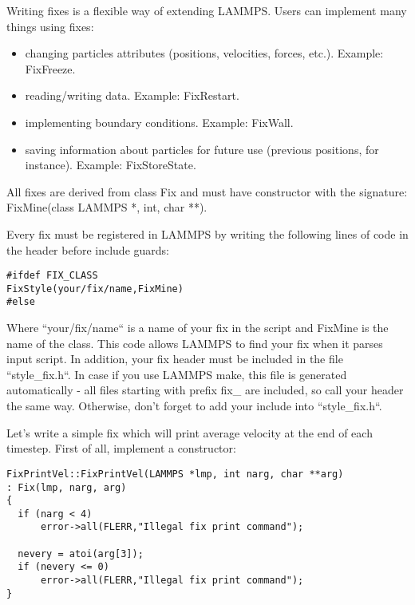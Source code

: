 \documentclass{article}
\begin{document}
Writing fixes is a flexible way of extending LAMMPS.  Users can
implement many things using fixes:

\begin{itemize}
\item changing particles attributes (positions, velocities, forces, etc.).
Example: FixFreeze.
\item reading/writing data. Example: FixRestart.
\item implementing boundary conditions. Example: FixWall.
\item saving information about particles for future use (previous positions,
for instance). Example: FixStoreState.
\end{itemize}

All fixes are derived from class Fix and must have constructor with the
signature: FixMine(class LAMMPS *, int, char **).

Every fix must be registered in LAMMPS by writing the following lines
of code in the header before include guards:

 \begin{center}
 \begin{verbatim}
#ifdef FIX_CLASS
FixStyle(your/fix/name,FixMine)
#else
  \end{verbatim}
 \end{center}

Where ``your/fix/name`` is a name of your fix in the script and FixMine
is the name of the class. This code allows LAMMPS to find your fix
when it parses input script. In addition, your fix header must be
included in the file ``style\_fix.h``. In case if you use LAMMPS make,
this file is generated automatically - all files starting with prefix
fix\_ are included, so call your header the same way. Otherwise, don't
forget to add your include into ``style\_fix.h``.

Let's write a simple fix which will print average velocity at the end
of each timestep. First of all, implement a constructor:

 \begin{center}
 \begin{verbatim}
FixPrintVel::FixPrintVel(LAMMPS *lmp, int narg, char **arg)
: Fix(lmp, narg, arg)
{
  if (narg < 4)
      error->all(FLERR,"Illegal fix print command");

  nevery = atoi(arg[3]);
  if (nevery <= 0)
      error->all(FLERR,"Illegal fix print command");
}
  \end{verbatim}
 \end{center}
\end{document}
